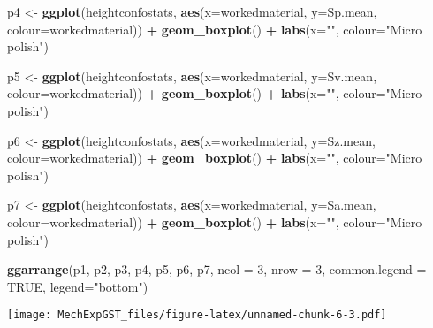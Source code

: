 \documentclass[
]{article}
\newenvironment{Shaded}{\begin{snugshade}}{\end{snugshade}}
\newcommand{\DataTypeTok}[1]{\textcolor[rgb]{0.13,0.29,0.53}{#1}}
\newcommand{\DecValTok}[1]{\textcolor[rgb]{0.00,0.00,0.81}{#1}}
\newcommand{\KeywordTok}[1]{\textcolor[rgb]{0.13,0.29,0.53}{\textbf{#1}}}
\newcommand{\NormalTok}[1]{#1}
\newcommand{\OperatorTok}[1]{\textcolor[rgb]{0.81,0.36,0.00}{\textbf{#1}}}
\newcommand{\OtherTok}[1]{\textcolor[rgb]{0.56,0.35,0.01}{#1}}
\newcommand{\StringTok}[1]{\textcolor[rgb]{0.31,0.60,0.02}{#1}}
\begin{document}
\begin{Shaded}
\begin{Highlighting}[]
\NormalTok{p4 <-}\StringTok{ }\KeywordTok{ggplot}\NormalTok{(heightconfostats, }\KeywordTok{aes}\NormalTok{(}\DataTypeTok{x=}\NormalTok{workedmaterial, }\DataTypeTok{y=}\NormalTok{Sp.mean, }\DataTypeTok{colour=}\NormalTok{workedmaterial)) }\OperatorTok{+}\StringTok{ }
\StringTok{  }\KeywordTok{geom_boxplot}\NormalTok{() }\OperatorTok{+}
\StringTok{  }\KeywordTok{labs}\NormalTok{(}\DataTypeTok{x=}\StringTok{""}\NormalTok{, }\DataTypeTok{colour=}\StringTok{"Micro polish"}\NormalTok{)}

\NormalTok{p5 <-}\StringTok{ }\KeywordTok{ggplot}\NormalTok{(heightconfostats, }\KeywordTok{aes}\NormalTok{(}\DataTypeTok{x=}\NormalTok{workedmaterial, }\DataTypeTok{y=}\NormalTok{Sv.mean, }\DataTypeTok{colour=}\NormalTok{workedmaterial)) }\OperatorTok{+}\StringTok{ }
\StringTok{  }\KeywordTok{geom_boxplot}\NormalTok{() }\OperatorTok{+}
\StringTok{  }\KeywordTok{labs}\NormalTok{(}\DataTypeTok{x=}\StringTok{""}\NormalTok{, }\DataTypeTok{colour=}\StringTok{"Micro polish"}\NormalTok{)}

\NormalTok{p6 <-}\StringTok{ }\KeywordTok{ggplot}\NormalTok{(heightconfostats, }\KeywordTok{aes}\NormalTok{(}\DataTypeTok{x=}\NormalTok{workedmaterial, }\DataTypeTok{y=}\NormalTok{Sz.mean, }\DataTypeTok{colour=}\NormalTok{workedmaterial)) }\OperatorTok{+}\StringTok{ }
\StringTok{  }\KeywordTok{geom_boxplot}\NormalTok{() }\OperatorTok{+}
\StringTok{  }\KeywordTok{labs}\NormalTok{(}\DataTypeTok{x=}\StringTok{""}\NormalTok{, }\DataTypeTok{colour=}\StringTok{"Micro polish"}\NormalTok{)}

\NormalTok{p7 <-}\StringTok{ }\KeywordTok{ggplot}\NormalTok{(heightconfostats, }\KeywordTok{aes}\NormalTok{(}\DataTypeTok{x=}\NormalTok{workedmaterial, }\DataTypeTok{y=}\NormalTok{Sa.mean, }\DataTypeTok{colour=}\NormalTok{workedmaterial)) }\OperatorTok{+}\StringTok{ }
\StringTok{  }\KeywordTok{geom_boxplot}\NormalTok{() }\OperatorTok{+}
\StringTok{  }\KeywordTok{labs}\NormalTok{(}\DataTypeTok{x=}\StringTok{""}\NormalTok{, }\DataTypeTok{colour=}\StringTok{"Micro polish"}\NormalTok{)}

\KeywordTok{ggarrange}\NormalTok{(p1, p2, p3, p4, p5, p6, p7, }\DataTypeTok{ncol =} \DecValTok{3}\NormalTok{, }\DataTypeTok{nrow =} \DecValTok{3}\NormalTok{, }\DataTypeTok{common.legend =} \OtherTok{TRUE}\NormalTok{, }\DataTypeTok{legend=}\StringTok{"bottom"}\NormalTok{)}
\end{Highlighting}
\end{Shaded}

\texttt{[image: MechExpGST\_files/figure-latex/unnamed-chunk-6-3.pdf]}
\end{document}
